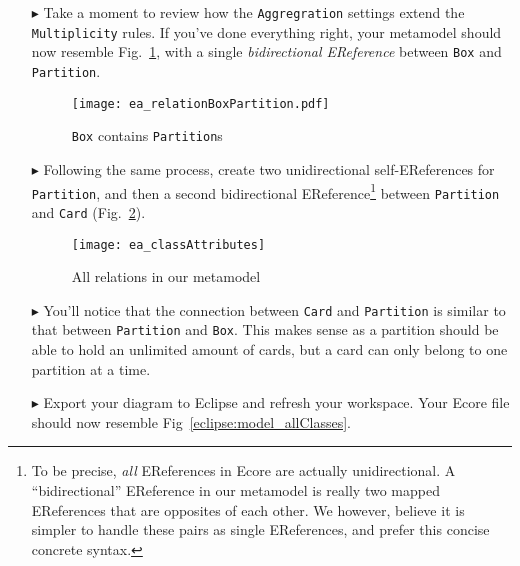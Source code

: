 \begin{itemize}
\item[$\blacktriangleright$] Take a moment to review how the \texttt{Aggregration} settings extend the \texttt{Multiplicity} rules. If you've done everything
right, your metamodel should now resemble Fig.~\ref{ea:ereference_completed}, with a single \emph{bidirectional EReference} between \texttt{Box} and
\texttt{Partition}.

\vspace{1cm}

\begin{figure}[htbp]
	\centering
  \texttt{[image: ea\_relationBoxPartition.pdf]}
	\caption{\texttt{Box} contains \texttt{Partition}s}
	\label{ea:ereference_completed}
\end{figure}
\FloatBarrier

\item[$\blacktriangleright$] Following the same process, create two unidirectional self-EReferences for \texttt{Partition}, and then a second bidirectional
EReference\footnote{To be precise, \emph{all} EReferences in Ecore are actually unidirectional. A ``bidirectional'' EReference in our metamodel is really two
mapped EReferences that are opposites of each other. We however, believe it is simpler to handle these pairs as single EReferences, and prefer this
concise concrete syntax.} between \texttt{Partition} and \texttt{Card} (Fig.~\ref{ea:ereferences_all}). 

\vspace{1cm}

\begin{figure}[htbp]
	\centering
  \texttt{[image: ea\_classAttributes]}
	\caption{All relations in our metamodel}
	\label{ea:ereferences_all}
\end{figure}
\FloatBarrier

\vspace{1cm}

\item[$\blacktriangleright$] You'll notice that the connection between \texttt{Card} and \texttt{Partition} is similar to that between \texttt{Partition} and
\texttt{Box}. This makes sense as a partition should be able to hold an unlimited amount of cards, but a card can only belong to one partition at a time.

\vspace{1cm}

\item[$\blacktriangleright$] Export your diagram to Eclipse and refresh your workspace. Your Ecore file should now resemble Fig~\ref{eclipse:model_allClasses}.


\end{itemize}
